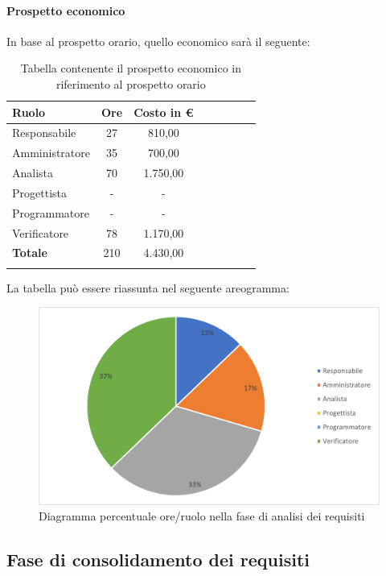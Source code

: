 			\paragraph{Prospetto economico}
			In base al prospetto orario, quello economico sarà il seguente: 
			
			\begin{longtable}{|l|c|c|c|c|c|c|c|}
				\hline
				\rowcolor{lighter-grayer}
				\textbf{Ruolo} & \textbf{Ore} & \textbf{Costo in €} \\
				\hline
				\endfirsthead
				
				\hline
				Responsabile & 27 & 810,00\\
				\hline
				\hline
				Amministratore & 35 & 700,00\\
				\hline
				\hline
				Analista & 70 & 1.750,00\\
				\hline
				\hline
				Progettista & - & -\\
				\hline
				\hline
				Programmatore & - & -\\
				\hline
				\hline
				Verificatore & 78 & 1.170,00\\
				\hline
				\textbf{Totale} & 210 & 4.430,00\\
				\hline
				\rowcolor{white}
				\caption{Tabella contenente il prospetto economico in riferimento al prospetto orario}
			\end{longtable}
			\pagebreak
		
			La tabella può essere riassunta nel seguente areogramma:
			\begin{figure}[H]
				\centering
				\includegraphics[width=0.8\linewidth]{res/images/preventivo/1-2.png}
				\caption{Diagramma percentuale ore/ruolo nella fase di analisi dei requisiti}
				\label{fig:diagramma costi ruolo fase analisi dei requisiti}
            \end{figure}

            \subsection{Fase di consolidamento dei requisiti}
